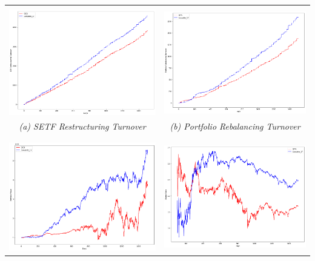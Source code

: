 \documentclass[../main.tex]{subfiles}
\begin{document}
\begin{table}[!h]
    \centering
    \begin{tabular}{|c|c|}
        \hline
        & \\
        \includegraphics[width=.48\linewidth]{images/etf_restrut_compare.png} &
        \includegraphics[width=.48\linewidth]{images/port_rebal_compare.png} \\
        \textit{(a) SETF Restructuring Turnover} & \textit{(b) Portfolio Rebalancing Turnover} \\
        & \\
        \hline
        & \\
        \includegraphics[width=.48\linewidth]{images/value_compare.png} &
        \includegraphics[width=.48\linewidth]{images/sharpe_compare.png} \\

\end{tabular}
\end{table}
\end{document}
